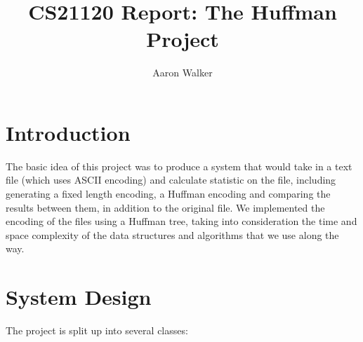 \documentclass[11pt, oneside]{amsart}
\title{CS21120 Report: The Huffman Project}
\author{Aaron Walker}
\begin{document}
\maketitle
\section{Introduction}
The basic idea of this project was to produce a system that would take in a text file (which uses ASCII encoding) and calculate statistic on the file, including generating a fixed length encoding, a Huffman encoding and comparing the results between them, in addition to the original file. We implemented the encoding of the files using a Huffman tree, taking into consideration the time and space complexity of the data structures and algorithms that we use along the way.
\section{System Design}
The project is split up into several classes:
\end{document}
